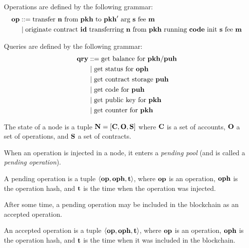 \documentclass[a4paper]{llncs}
\begin{document}
\begin{definition}[Operation]
  Operations are defined by the following grammar:
  \begin{align*}
    \OP &::= \TRANSFER[\STRING]\NTEZ\PKH{\PKH'}\MTEZ
    \\&\mid \ORIGINATE\ID\NTEZ\PKH\CODE\STRING\MTEZ
  \end{align*}
\end{definition}

\begin{definition}[Query]
Queries are defined by the following grammar:
\begin{align*}
  \QRY & ::= \GETBALANCE {\PKH / \PUH}
  \\&\mid \GETSTATUS\OPH
  \\&\mid \GETSTORAGE\PUH
  \\&\mid \GETCODE\PUH 
  \\&\mid \GETPUBLICKEY\PKH
  \\&\mid \GETCOUNTER\PKH
\end{align*}


\end{definition}
 \begin{definition}
   The state of a node is a tuple
   $\NODE = [\ACCOUNTS, \OPERATIONS, \CONTRACTS]$ where $\ACCOUNTS$ is a set of accounts,
   $\OPERATIONS$ a set of operations, and $\CONTRACTS$  a set of contracts. 
\end{definition}

When an operation is injected in a node, it enters a \emph{pending pool}
(and is called a \emph{pending operation}). 
 \begin{definition}
A pending operation is a tuple  $\langle  \OP, \OPH, \TIME
\rangle $, where $\OP$ is an operation, $\OPH$ is the operation hash,
and $\TIME$ is the time when the operation was injected. 
\end{definition}
After some time, a pending operation may be included in the blockchain as an accepted operation.
 \begin{definition}
An accepted operation  is a tuple $\langle  \OP, \OPH, \TIME \rangle
$, where $\OP$ is an operation, $\OPH$ is the operation hash, and
$\TIME$ is the time when it was included in the blockchain. 
\end{definition}
\end{document}
